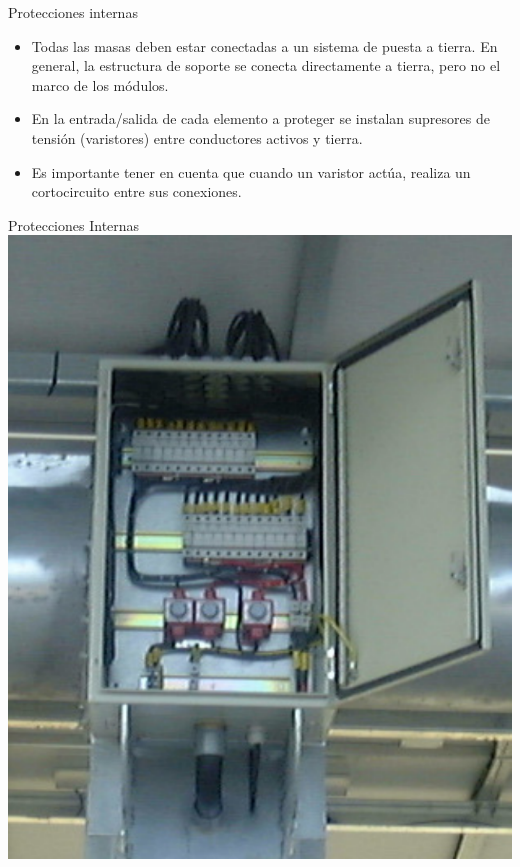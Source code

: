 \documentclass[xcolor={usenames,svgnames,dvipsnames}]{beamer}
\begin{document}
\begin{frame}[label=sec-4-2-6]{Protecciones internas}
\begin{itemize}
\item \alert{Todas las masas deben estar conectadas a un sistema de puesta a
tierra}. En general, la estructura de soporte se conecta directamente
a tierra, pero no el marco de los módulos.

\item En la entrada/salida de cada elemento a proteger se instalan
\alert{supresores de tensión (varistores)} entre conductores activos y
tierra.

\item Es importante tener en cuenta que cuando un varistor actúa, realiza
un cortocircuito entre sus conexiones.
\end{itemize}
\end{frame}


\begin{frame}[label=sec-4-2-7]{Protecciones Internas}
\includegraphics[height=0.8\textheight]{../figs/CajaProteccionesPhotocampa.pdf}
\end{frame}
\end{document}
